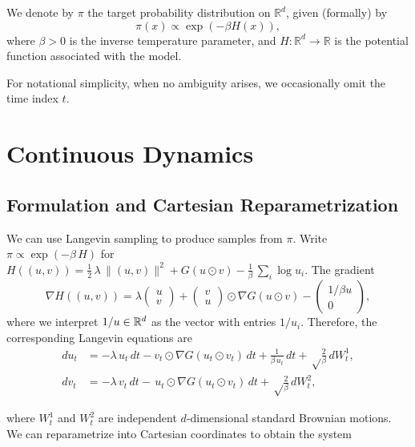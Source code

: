 \documentclass[11pt, twoside]{report}
\begin{document}
We denote by $\pi$ the target probability distribution on $\mathbb R^d$, given (formally) by
\[
\pi(x) \propto \exp(-\beta H(x)),
\]
where $\beta>0$ is the inverse temperature parameter, and $H:\mathbb R^d \to \mathbb R$ is the potential function associated with the model.

For notational simplicity, when no ambiguity arises, we occasionally omit the time index $t$.

\section{Continuous Dynamics}
\subsection{Formulation and Cartesian Reparametrization}
We can use Langevin sampling to produce samples from $\pi$. Write $\pi\propto\exp(-\beta\, H)$ for $H((u,v))=\frac 12 \,\lambda\, \|(u,v)\|^2 + G(u\odot v)- \frac{1}{\beta}\,\sum_i\log u_i$. The gradient
\[
\nabla H((u,v))=\lambda\begin{pmatrix}
    u\\v
\end{pmatrix}
+\begin{pmatrix}
    v\\ u
\end{pmatrix}\odot \nabla G(u\odot v)
-\begin{pmatrix}
    1/\beta u\\ 0
\end{pmatrix},
\]
where we interpret $1/u\in\mathbb{R}^d$ as the vector with entries $1/u_i$. Therefore, the corresponding Langevin equations are 
\begin{equation} \label{uvproc}
\begin{split}
du_t&=-\lambda\,   u_t\,dt - v_t\odot \nabla G(u_t\odot v_t)\,dt
 +\frac{1}{\beta \,u_t}\,dt+ \sqrt\frac{2}{\beta}\,dW^1_t,\\
dv_t&=-\lambda\,  v_t\,dt -  \,u_t \odot \nabla G(u_t\odot v_t)\,dt+  \sqrt\frac{2}{\beta}\,dW^2_t,
\end{split}
\end{equation}

where $W_t^1$ and $W_t^2$ are independent $d$-dimensional standard Brownian motions. We can reparametrize into Cartesian coordinates to obtain the system
\end{document}
